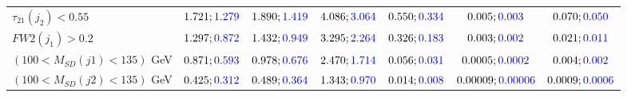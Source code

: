 \begin{landscape}
\begin{table}
\begin{tabular}{lcccccc}
				\rowcolor{black!7}$\tau_{21}(j_2)<0.55$ &$1.721;\textcolor{blue}{1.279}$ &$1.890;\textcolor{blue}{1.419}$ &$4.086;\textcolor{blue}{3.064}$&$0.550;\textcolor{blue}{0.334}$&$0.005;\textcolor{blue}{0.003}$&$0.070;\textcolor{blue}{0.050}$\\
				$FW2(j_1)>0.2$ &$1.297;\textcolor{blue}{0.872}$ &$1.432;\textcolor{blue}{0.949}$&$3.295;\textcolor{blue}{2.264}$&$0.326;\textcolor{blue}{0.183}$&$0.003;\textcolor{blue}{0.002}$&$0.021;\textcolor{blue}{0.011}$\\
				\rowcolor{black!7}$(100<M_{SD}(j1)<135)$ GeV& $0.871;\textcolor{blue}{0.593}$&$0.978;\textcolor{blue}{0.676}$&$2.470;\textcolor{blue}{1.714}$&$0.056;\textcolor{blue}{0.031}$&$0.0005;\textcolor{blue}{0.0002}$&$0.004;\textcolor{blue}{0.002}$\\
				$(100<M_{SD}(j2)<135)$ GeV &$0.425;\textcolor{blue}{0.312}$ &$0.489;\textcolor{blue}{0.364}$ &$1.343;\textcolor{blue}{0.970}$&$0.014;\textcolor{blue}{0.008}$&$0.00009;\textcolor{blue}{0.00006}$&$0.0009;\textcolor{blue}{0.0006}$\\
				\bottomrule
			\end{tabular}
		\end{table}


\end{landscape}
